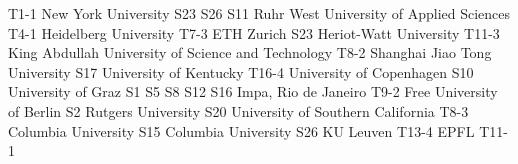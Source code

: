 \begin{multicols}{2}
{T1-1}
{}
{}
{}
{}
{}
{}
{New York University}
{S23}
{S26}
{S11}
{}
{}
{}
{}
{Ruhr West University of Applied Sciences}
{T4-1}
{}
{}
{}
{}
{}
{}
{Heidelberg University}
{T7-3}
{}
{}
{}
{}
{}
{}
{ETH Zurich}
{S23}
{}
{}
{}
{}
{}
{}
{Heriot-Watt University}
{T11-3}
{}
{}
{}
{}
{}
{}
{King Abdullah University of Science and Technology}
{T8-2}
{}
{}
{}
{}
{}
{}
{Shanghai Jiao Tong University}
{S17}
{}
{}
{}
{}
{}
{}
{University of Kentucky}
{T16-4}
{}
{}
{}
{}
{}
{}
{University of Copenhagen}
{S10}
{}
{}
{}
{}
{}
{}
{University of Graz}
{S1}
{S5}
{S8}
{S12}
{S16}
{}
{}
{Impa, Rio de Janeiro}
{T9-2}
{}
{}
{}
{}
{}
{}
{Free University of Berlin}
{S2}
{}
{}
{}
{}
{}
{}
{Rutgers University}
{S20}
{}
{}
{}
{}
{}
{}
{University of Southern California}
{T8-3}
{}
{}
{}
{}
{}
{}
{Columbia University}
{S15}
{}
{}
{}
{}
{}
{}
{Columbia University}
{S26}
{}
{}
{}
{}
{}
{}
{KU Leuven}
{T13-4}
{}
{}
{}
{}
{}
{}
{EPFL}
{T11-1}
{}
{}
{}
{}
{}
{}
\end{multicols}
